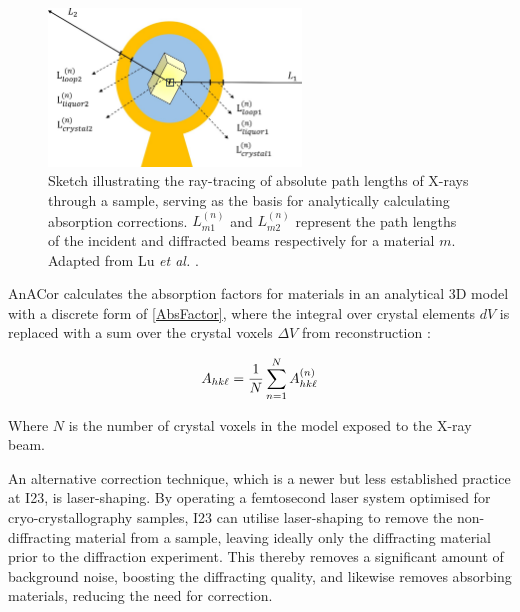 \begin{figure}
    \centering
    \includegraphics[width = 0.6\textwidth]{images/absorption correction diagram.jpg}
    \caption{Sketch illustrating the ray-tracing of absolute path lengths of X-rays through a sample, serving as the basis for analytically calculating absorption corrections. $L_{m1}^{(n)}$ and $L_{m2}^{(n)}$ represent the path lengths of the incident and diffracted beams respectively for a material $m$. Adapted from Lu \textit{et al.} \cite{Lu2024}.
    }
    \label{fig:analytical correction model}
\end{figure}

AnACor calculates the absorption factors for materials in an analytical 3D model with a discrete form of \cref{AbsFactor}, where the integral over crystal elements $dV$ is replaced with a sum over the crystal voxels $\Delta V$ from  reconstruction \cite{Lu2024}: %

\begin{equation}
    A_{hk\ell} = \frac{1}{N} \sum_{n=1}^N A_{hk\ell}^{(n)}
\end{equation}

Where $N$ is the number of crystal voxels in the model exposed to the X-ray beam.

An alternative correction technique, which is a newer but less established practice at I23, is laser-shaping. By operating a femtosecond laser system optimised for cryo-crystallography samples, I23 can utilise laser-shaping to remove the non-diffracting material from a sample, leaving ideally only the diffracting material prior to the diffraction experiment. This thereby removes a significant amount of background noise, boosting the diffracting quality, and likewise removes absorbing materials, reducing the need for correction.

